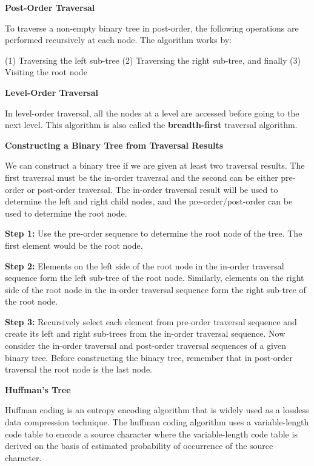 \vskip 3mm
{\bf Post-Order Traversal}

\vskip 1mm
To traverse a non-empty binary tree in post-order, the following operations are performed recursively at each node. The algorithm works by:

\vskip 1mm
\qquad(1) Traversing the left sub-tree
\vskip 1mm
\qquad(2) Traversing the right sub-tree, and finally
\vskip 1mm
\qquad(3) Visiting the root node

\vskip 3mm
{\bf Level-Order Traversal}

\vskip 1mm
In level-order traversal, all the nodes at a level are accessed before going to the next level. This algorithm is also called the {\bf breadth-first} traversal algorithm.

\vskip 3mm
{\bf Constructing a Binary Tree from Traversal Results}

\vskip 1mm
We can construct a binary tree if we are given at least two traversal results. The first traversal must be the in-order traversal and the second can be either pre-order or post-order traversal. The in-order traversal result will be used to determine the left and right child nodes, and the pre-order/post-order can be used to determine the root node.

\vskip 3mm
{\bf Step 1:} Use the pre-order sequence to determine the root node of the tree. The first element would be the root node.

\vskip 1mm
{\bf Step 2:} Elements on the left side of the root node in the in-order traversal sequence form the left sub-tree of the root node. Similarly, elements on the right side of the root node in the in-order traversal sequence form the right sub-tree of the root node.

\vskip 1mm
{\bf Step 3:} Recursively select each element from pre-order traversal sequence and create its left and right sub-trees from the in-order traversal sequence. Now consider the in-order traversal and post-order traversal sequences of a given binary tree. Before constructing the binary tree, remember that in post-order traversal the root node is the last node.

\filbreak
\vskip 1cm
{\bf Huffman's Tree}

\vskip 3mm
Huffman coding is an entropy encoding algorithm that is widely used as a lossless  data compression technique. The huffman coding algorithm uses a variable-length code table to encode a source character where the variable-length code table is derived on the basis of estimated probability of occurrence of the source character.

